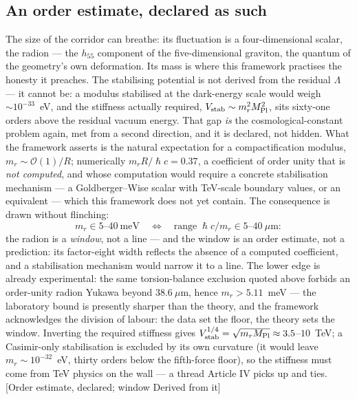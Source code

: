 \subsection{An order estimate, declared as such}
The size of the corridor can breathe: its fluctuation is a four-dimensional scalar, the radion --- the $h_{55}$ component of the five-dimensional graviton, the quantum of the geometry's own deformation. Its mass is where this framework practises the honesty it preaches. The stabilising potential is not derived from the residual $\Lambda$ --- it cannot be: a modulus stabilised at the dark-energy scale would weigh $\sim10^{-33}$~eV, and the stiffness actually required, $V_{\rm stab}\sim m_{r}^{2}M_{\rm Pl}^{2}$, sits sixty-one orders above the residual vacuum energy. That gap \emph{is} the cosmological-constant problem again, met from a second direction, and it is declared, not hidden. What the framework asserts is the natural expectation for a compactification modulus, $m_{r}\sim\mathcal{O}(1)/R$; numerically $m_{r}R/\hslash c=0.37$, a coefficient of order unity that is \emph{not computed}, and whose computation would require a concrete stabilisation mechanism --- a Goldberger--Wise scalar with TeV-scale boundary values, or an equivalent --- which this framework does not yet contain. The consequence is drawn without flinching:
\begin{equation}
m_{r}\in5\text{--}40~\mathrm{meV}\quad\Longleftrightarrow\quad \text{range}\;\hslash c/m_{r}\in5\text{--}40~\mu\mathrm{m}:
\end{equation}
the radion is a \emph{window}, not a line --- and the window is an order estimate, not a prediction: its factor-eight width reflects the absence of a computed coefficient, and a stabilisation mechanism would narrow it to a line. The lower edge is already experimental: the same torsion-balance exclusion quoted above forbids an order-unity radion Yukawa beyond $38.6~\mu$m, hence $m_{r}>5.11$~meV --- the laboratory bound is presently sharper than the theory, and the framework acknowledges the division of labour: the data set the floor, the theory sets the window. Inverting the required stiffness gives $V_{\rm stab}^{1/4}=\sqrt{m_{r}M_{\rm Pl}}\approx3.5$--$10$~TeV; a Casimir-only stabilisation is excluded by its own curvature (it would leave $m_{r}\sim10^{-32}$~eV, thirty orders below the fifth-force floor), so the stiffness must come from TeV physics on the wall --- a thread Article IV picks up and ties. [Order estimate, declared; window Derived from it]

